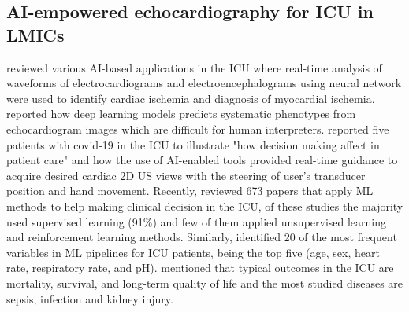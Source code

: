 \documentclass[mlabstract,twocolumn]{jmlr}
\begin{document}
\subsection{AI-empowered echocardiography for ICU in LMICs}
\citet{hanson2001} reviewed various AI-based applications in the ICU where real-time analysis of waveforms of electrocardiograms and electroencephalograms using neural network were used to identify cardiac ischemia and diagnosis of myocardial ischemia.
\citet{Ghorbani-DigitalMedicineNature-JAN2020} reported how deep learning models predicts systematic phenotypes from echocardiogram images which are difficult for human interpreters.
\citet{CHEEMA2021JACCCaseReports} reported five patients with covid-19 in the ICU to illustrate "how decision making affect in patient care" and how the use of AI-enabled tools provided real-time guidance to acquire desired cardiac 2D US views with the steering of user's transducer position and hand movement.
Recently, \citet{hong2022} reviewed 673 papers that apply ML methods to help making clinical decision in the ICU, of these studies the majority used supervised learning (91\%) and few of them applied unsupervised learning and reinforcement learning methods.
Similarly, \citet{hong2022} identified 20 of the most frequent variables in ML pipelines for ICU patients, being the top five (age, sex, heart rate, respiratory rate, and pH).
\citet{hong2022} mentioned that typical outcomes in the ICU are mortality, survival, and long-term quality of life and the most studied diseases are sepsis, infection and kidney injury.
\end{document}
